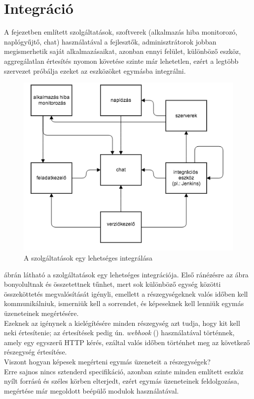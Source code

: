 \section{Integráció\\}
\label{section:service_integration}
A fejezetben említett szolgáltatások, szoftverek (alkalmazás hiba monitorozó, naplógyűjtő, chat) használatával a fejlesztők, adminisztrátorok jobban megismerhetik saját alkalmazásaikat, azonban ennyi felület, különböző eszköz, aggregálatlan értesítés nyomon követése szinte már lehetetlen, ezért a legtöbb szervezet próbálja ezeket az eszközöket egymásba integrálni.
\begin{figure}[ht]
	\centering
		\includegraphics[scale=1.0]{assets/integrated_services.png}%
		\caption[DUMMY]%
		{A szolgáltatások egy lehetséges integrálása}%
		\label{fig:integrated-services}
\end{figure}
 ábrán látható a szolgáltatások egy lehetséges integrációja. Első ránézésre az ábra bonyolultnak és összetettnek tűnhet, mert sok különböző egység közötti összeköttetés megvalósítását igényli, emellett a részegységeknek valós időben kell kommunikálniuk, ismerniük kell a sorrendet, és képeseknek kell lenniük egymás üzeneteinek megértésére.\\
Ezeknek az igénynek a kielégítésére minden részegység azt tudja, hogy kit kell neki értesítenie; az értesítések pedig ún. \emph{webhook} (\cite{web_hook}) használatával történnek, amely egy egyszerű HTTP kérés, ezáltal valós időben történhet meg az következő részegység értesítése.\\
Viszont hogyan képesek megérteni egymás üzeneteit a részegységek?\\
Erre sajnos nincs sztenderd specifikáció, azonban szinte minden említett eszköz nyílt forrású és széles körben elterjedt, ezért egymás üzeneteinek feldolgozása, megértése már megoldott beépülő modulok használatával.\\

